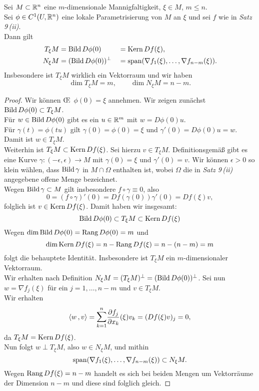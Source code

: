 \documentclass[skript.tex]{subfiles}
\begin{document}
	\begin{theorem}
		Sei $M\subset{\mathbb{R}^n}$ eine $m$-dimensionale Mannigfaltigkeit, $\xi \in M$, $m \leq n$.\\
		Sei $\phi \in C^1(U,{\mathbb{R}^n})$ eine lokale Parametrisierung von $M$ an $\xi$ und sei $f$ wie in \emph{Satz 9\,(ii)}.\\
		Dann gilt
		\begin{alignat*}{2}
			T_\xi M &= \operatorname{Bild} D\phi(0) &&=\operatorname{Kern} Df(\xi),\\
			N_\xi M &= (\operatorname{Bild} D\phi(0))^\perp &&=\operatorname{span}(\nabla f_1(\xi),\dotsc,\nabla f_{n-m}(\xi)).
		\end{alignat*}
		Insbesondere ist $T_\xi M$ wirklich ein Vektorraum und wir haben
		\[
			\dim T_\xi M = m, \qquad \dim N_\xi M = n-m.
		\]
	\end{theorem}
	\begin{proof}
		Wir können \OE\ $\phi(0) = \xi$ annehmen.
		Wir zeigen zunächst $\operatorname{Bild} D\phi(0) \subset T_\xi M$.\\
		Für $w\in\operatorname{Bild} D\phi(0)$ gibt es ein
		$u\in\mathbb{R}^m$ mit $w=D\phi(0)u$.\\
		Für $\gamma(t)=\phi(tu)$ gilt $\gamma(0) = \phi(0) = \xi$ und $\gamma'(0) = D\phi(0)u=w$. Damit ist $w \in T_\xi M$.\\
		Weiterhin ist $T_\xi M \subset \operatorname{Kern} Df(\xi)$.
		Sei hierzu $v \in T_\xi M$. Definitionsgemäß gibt es eine
		Kurve $\gamma \colon (-\epsilon,\epsilon) \to M$ mit $\gamma(0)=\xi$ und $\gamma'(0)=v$. Wir können $\epsilon>0$ so klein wählen, dass $\operatorname{Bild}\gamma$ in $M\cap\Omega$ enthalten ist, wobei $\Omega$ die
		in \emph{Satz 9\,(ii)} angegebene offene Menge bezeichnet.\\
		Wegen $\operatorname{Bild}\gamma \subset M$ gilt insbesondere
		$f\circ\gamma\equiv0$, also
		\[
			0 = (f\circ\gamma)'(0) = Df(\gamma(0))\gamma'(0) = Df(\xi)v,
		\]
		folglich ist $v \in \operatorname{Kern} Df(\xi)$. Damit haben wir insgesamt:
		\[
			\operatorname{Bild} D\phi(0) \subset T_\xi M \subset \operatorname{Kern} Df(\xi)
		\]
		Wegen $\dim\operatorname{Bild} D\phi(0) = \operatorname{\operatorname{Rang}} D\phi(0) = m$ und
		\[
			\dim\operatorname{Kern} Df(\xi) = n - \operatorname{\operatorname{Rang}} Df(\xi) = n-(n-m) = m
		\]
		folgt die behauptete Identität. Insbesondere ist $T_\xi M$ ein $m$-dimensionaler Vektorraum.\\
		Wir erhalten nach Definition $N_\xi M = (T_\xi M)^\perp
		= (\operatorname{Bild} D\phi(0))^\perp$.
		Sei nun $w = \nabla f_j(\xi)$ für ein $j=1,\dotsc,n-m$ und $v \in T_\xi M$.\\
		Wir erhalten
		\[
			\skp{w}{v} = \mathlarger\sum_{k=1}^n \ddel{f_j}{x_k}(\xi) v_k = (Df(\xi)v)_j = 0,
		\]
		da $T_\xi M = \operatorname{Kern} Df(\xi)$.\\
		Nun folgt $w \perp T_\xi M$, also $w \in N_\xi M$, und mithin
		\[
			\operatorname{span}(\nabla f_1(\xi),\dotsc,\nabla f_{n-m}(\xi)) \subset N_\xi M.
		\]
		Wegen $\operatorname{\operatorname{Rang}} Df(\xi) = n-m$ handelt es sich bei beiden Mengen um Vektorräume der Dimension $n-m$ und diese sind folglich gleich.
	\end{proof}
\end{document}
